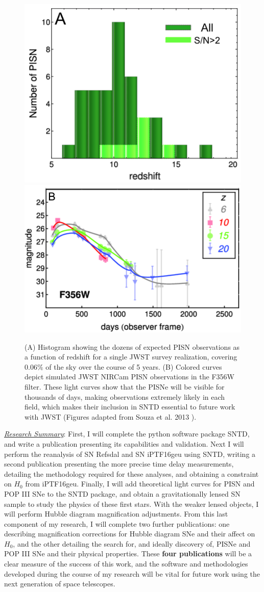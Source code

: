 \begin{figure}
\centering
\includegraphics[height=.3\textwidth]{FIG/pisn_rates}
\includegraphics[height=.3\textwidth]{FIG/jwst_sim}
\caption{
\noindent\fontsize{10}{14}\selectfont
(A) Histogram showing the dozens of expected PISN observations as a
function of redshift for a single JWST survey realization, covering
0.06$\%$ of the sky over the course of 5 years. (B) Colored curves
depict simulated JWST NIRCam PISN observations in the F356W
filter. These light curves show that the PISNe will be visible for
thousands of days, making observations extremely likely in each field,
which makes their inclusion in SNTD essential to future work with JWST (Figures
adapted from Souza et al. 2013 \cite{Souza:2013}).}
\end{figure}

\noindent\underline{\textit{Research Summary}}:
First, I will complete the python software package SNTD, and write a
publication presenting its capabilities and validation. Next I will
perform the reanalysis of SN Refsdal and SN iPTF16geu using SNTD,
writing a second publication presenting the more precise time delay
measurements, detailing the methodology required for these analyses,
and obtaining a constraint on $H_0$ from iPTF16geu. Finally, I will
add theoretical light curves for PISN and POP III SNe to the SNTD
package, and obtain a gravitationally lensed SN sample to study the
physics of these first stars. With the weaker lensed objects, I will
perform Hubble diagram magnification adjustments. From this last
component of my research, I will complete two further publications:
one describing magnification corrections for Hubble diagram SNe and
their affect on $H_0$, and the other detailing the search for, and
ideally discovery of, PISNe and POP III SNe and their physical
properties. These \textbf{four publications} will be a clear measure of the
success of this work, and the software and methodologies developed
during the course of my research will be vital for future work
using the next generation of space telescopes.

